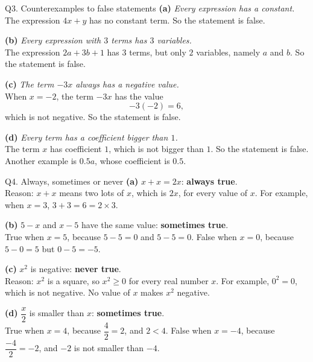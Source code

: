\documentclass[14pt,a4paper]{extarticle}
\begin{document}
\begin{sol}{Q3. Counterexamples to false statements}
\textbf{(a)} \textit{Every expression has a constant.}\\[2pt]
The expression \(4x+y\) has no constant term. So the statement is false.

\vspace{4pt}
\textbf{(b)} \textit{Every expression with \(3\) terms has \(3\) variables.}\\[2pt]
The expression \(2a+3b+1\) has \(3\) terms, but only \(2\) variables,
namely \(a\) and \(b\). So the statement is false.

\vspace{4pt}
\textbf{(c)} \textit{The term \(-3x\) always has a negative value.}\\[2pt]
When \(x=-2\), the term \(-3x\) has the value
\[
-3(-2)=6,
\]
which is not negative. So the statement is false.

\vspace{4pt}
\textbf{(d)} \textit{Every term has a coefficient bigger than \(1\).}\\[2pt]
The term \(x\) has coefficient \(1\), which is not bigger than \(1\).
So the statement is false. Another example is \(0.5a\), whose coefficient
is \(0.5\).
\end{sol}

\begin{sol}{Q4. Always, sometimes or never}
\textbf{(a)} \(x+x=2x\): \textbf{always true}.\\[2pt]
Reason: \(x+x\) means two lots of \(x\), which is \(2x\), for every value
of \(x\). For example, when \(x=3\), \(3+3=6=2\times 3\).

\vspace{6pt}
\textbf{(b)} \(5-x\) and \(x-5\) have the same value: \textbf{sometimes true}.\\[2pt]
True when \(x=5\), because \(5-5=0\) and \(5-5=0\).
False when \(x=0\), because \(5-0=5\) but \(0-5=-5\).

\vspace{6pt}
\textbf{(c)} \(x^2\) is negative: \textbf{never true}.\\[2pt]
Reason: \(x^2\) is a square, so \(x^2\ge 0\) for every real number \(x\).
For example, \(0^2=0\), which is not negative. No value of \(x\) makes
\(x^2\) negative.

\vspace{6pt}
\textbf{(d)} \(\dfrac{x}{2}\) is smaller than \(x\): \textbf{sometimes true}.\\[2pt]
True when \(x=4\), because \(\dfrac{4}{2}=2\), and \(2<4\).
False when \(x=-4\), because \(\dfrac{-4}{2}=-2\), and \(-2\) is not
smaller than \(-4\).
\end{sol}
\end{document}
